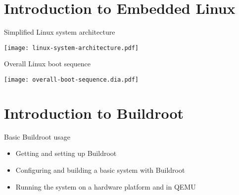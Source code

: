 \section{Introduction to Embedded Linux}

\begin{frame}{Simplified Linux system architecture}
  \begin{center}
    \texttt{[image: linux-system-architecture.pdf]}
  \end{center}
\end{frame}

\begin{frame}{Overall Linux boot sequence}
  \begin{center}
    \texttt{[image: overall-boot-sequence.dia.pdf]}
  \end{center}
\end{frame}

\section{Introduction to Buildroot}

\setuplabframe
{Basic Buildroot usage}
{
  \begin{itemize}
  \item Getting and setting up Buildroot
  \item Configuring and building a basic system with Buildroot
  \item Running the system on a hardware platform and in QEMU
  \end{itemize}
}
